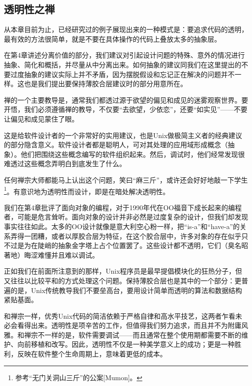 \documentclass[12pt,oneside]{book}
\begin{document}
\begin{common-format}
\subsection{透明性之禅}
从本章目前为止，已经研究过的例子展现出来的一种模式是：要追求代码的透明，最有效的方法很简单，就是不要在具体操作的代码上叠放太多的抽象层。

在第4章讲述分离价值的部分，我们建议对引起设计问题的特殊、意外的情况进行抽象、简化和概括，并尽量从中分离出来。如何抽象的建议同我们在这里提出的不要过度抽象的建议实际上并不矛盾，因为摆脱假设和忘记正在解决的问题并不一样。这也是我们提出要保持薄胶合层建议时的部分用意所在。

禅的一个主要教导是，通常我们都透过源于欲望的偏见和成见的迷雾观察世界。要开悟，我们必须遵循禅的教导，不仅要“去欲望，少依恋”，还要“如实见”——不要让偏见和成见蒙住了眼。

这是给软件设计者的一个非常好的实用建议，也是Unix做极简主义者的经典建议的部分隐含意义。软件设计者都是聪明人，可对其处理的应用域形成概念（抽象）。他们把围绕这些概念编写的软件组织起来。然后，调试时，他们经常发现很难透过这些概念弄明白到底发生了什么。

任何禅宗大师都能马上认出这个问题，笑曰“麻三斤”，或许还会好好地敲一下学生\footnote{参考“无门关洞山三斤”的公案[Mumon]。}。有意识地为透明性而设计，即是在暗处解决透明性。

我们在第4章批评了面向对象的编程，对于1990年代在OO福音下成长起来的编程者，可能是危言耸听。面向对象的设计并非必然是过度复杂的设计，但我们却发现事实往往如此。太多的OO设计就像是意大利空心粉一样，把“is-a”和“have-a”的关系弄得一团糟，或者以厚胶合层为特征，在这个胶合层中，许多对象的存在似乎只不过是为在陡峭的抽象金字塔上占个位置罢了。这些设计都不透明，它们（臭名昭著地）晦涩难懂并且难以调试。

正如我们在前面所注意到的那样，Unix程序员是最早提倡模块化的狂热分子，但又往往以比较平和的方式处理这个问题。保持薄胶合层也是其中的一个部分：更普遍的是，Unix传统教导我们不要垒高台，要用设计简单而透明的算法和数据结构紧贴基面。

和禅宗一样，优秀Unix代码的简洁依赖于严格自律和高水平技艺，这两者乍看未必会看得出来。透明性是项辛苦的工作，但值得我们努力追求，而且并不为附庸风雅。和禅宗不一样的是，软件需要调试——而且通常在整个使用期都需要不断的维护、向前移植和改写。因此，透明性不仅是一种美学意义上的成功；更是一种胜利，反映在软件整个生命周期上，意味着更低的成本。



\end{common-format}
\end{document}

